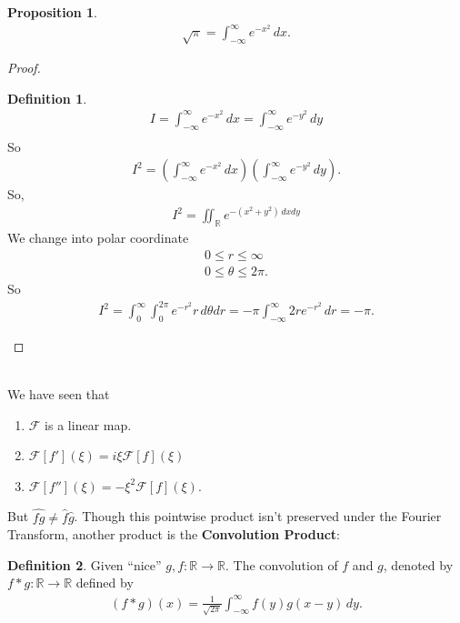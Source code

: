 \documentclass{article}
\theoremstyle{definition}
\newtheorem{defn}{Definition}[section]
\newtheorem{prop}{Proposition}[section]
\newcommand{\F}{\mathcal{F}}
\begin{document}
\begin{prop}
	\begin{align*}
	\sqrt{\pi} = \int^\infty_{-\infty}e^{-x^2}\,dx.
	\end{align*}
	
	\begin{proof}
		\begin{defn}
			\begin{align*}
			I = \int^\infty_{-\infty}e^{-x^2}\,dx = \int^\infty_{-\infty}e^{-y^2}\,dy\\
			\end{align*}
			So
			\begin{align*}
			I^2 = \left(\int^\infty_{-\infty}e^{-x^2}\,dx\right)\left(\int^\infty_{-\infty}e^{-y^2}\,dy\right).
			\end{align*}
			So,
			\begin{align*}
			I^2 = \iint_{\mathbb{R}}e^{-(x^2+y^2)\,dxdy}
			\end{align*}
			We change into polar coordinate
			\begin{align*}
			0 \leq r \leq \infty\\
			0 \leq \theta \leq 2\pi.
			\end{align*}
			So
			\begin{align*}
			I^2 = \int^\infty_0 \int^{2\pi}_0 e^{-r^2}r\,d\theta dr = -\pi\int^\infty_{-\infty}2re^{-r^2}\,dr = -\pi.
			\end{align*}
		\end{defn}
	\end{proof}
	
\end{prop}


$\,$\\


We have seen that 
\begin{enumerate}
	\item $\F$ is a linear map.
	\item $\F[f'](\xi) = i\xi \F[f](\xi)$
	\item $\F[f''](\xi) = -\xi^2 \F[f](\xi)$.
\end{enumerate}

But $\widehat{fg} \neq \hat{f}\hat{g}$. Though this pointwise product isn't preserved under the Fourier Transform, another product is the \textbf{Convolution Product}:

\begin{defn}
	Given ``nice'' $g,f : \mathbb{R} \to \mathbb{R}$. The convolution of $f$ and $g$, denoted by $f\ast g : \mathbb{R} \to \mathbb{R}$ defined by
	\begin{align*}
	(f\ast g)(x) = \frac{1}{\sqrt{2\pi}}\int^\infty_{-\infty}f(y)g(x-y)\,dy.
	\end{align*}
\end{defn}
\end{document}
